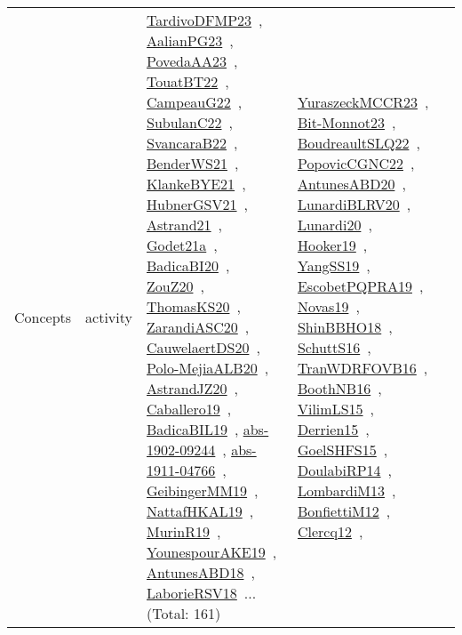 {\begin{longtable}{lp{3cm}>{\raggedright\arraybackslash}p{6cm}>{\raggedright\arraybackslash}p{6cm}>{\raggedright\arraybackslash}p{8cm}}
Concepts & activity & \href{works/TardivoDFMP23.pdf}{TardivoDFMP23}~\cite{TardivoDFMP23}, \href{works/AalianPG23.pdf}{AalianPG23}~\cite{AalianPG23}, \href{works/PovedaAA23.pdf}{PovedaAA23}~\cite{PovedaAA23}, \href{works/TouatBT22.pdf}{TouatBT22}~\cite{TouatBT22}, \href{works/CampeauG22.pdf}{CampeauG22}~\cite{CampeauG22}, \href{works/SubulanC22.pdf}{SubulanC22}~\cite{SubulanC22}, \href{works/SvancaraB22.pdf}{SvancaraB22}~\cite{SvancaraB22}, \href{works/BenderWS21.pdf}{BenderWS21}~\cite{BenderWS21}, \href{works/KlankeBYE21.pdf}{KlankeBYE21}~\cite{KlankeBYE21}, \href{works/HubnerGSV21.pdf}{HubnerGSV21}~\cite{HubnerGSV21}, \href{works/Astrand21.pdf}{Astrand21}~\cite{Astrand21}, \href{works/Godet21a.pdf}{Godet21a}~\cite{Godet21a}, \href{works/BadicaBI20.pdf}{BadicaBI20}~\cite{BadicaBI20}, \href{works/ZouZ20.pdf}{ZouZ20}~\cite{ZouZ20}, \href{works/ThomasKS20.pdf}{ThomasKS20}~\cite{ThomasKS20}, \href{works/ZarandiASC20.pdf}{ZarandiASC20}~\cite{ZarandiASC20}, \href{works/CauwelaertDS20.pdf}{CauwelaertDS20}~\cite{CauwelaertDS20}, \href{works/Polo-MejiaALB20.pdf}{Polo-MejiaALB20}~\cite{Polo-MejiaALB20}, \href{works/AstrandJZ20.pdf}{AstrandJZ20}~\cite{AstrandJZ20}, \href{works/Caballero19.pdf}{Caballero19}~\cite{Caballero19}, \href{works/BadicaBIL19.pdf}{BadicaBIL19}~\cite{BadicaBIL19}, \href{works/abs-1902-09244.pdf}{abs-1902-09244}~\cite{abs-1902-09244}, \href{works/abs-1911-04766.pdf}{abs-1911-04766}~\cite{abs-1911-04766}, \href{works/GeibingerMM19.pdf}{GeibingerMM19}~\cite{GeibingerMM19}, \href{works/NattafHKAL19.pdf}{NattafHKAL19}~\cite{NattafHKAL19}, \href{works/MurinR19.pdf}{MurinR19}~\cite{MurinR19}, \href{works/YounespourAKE19.pdf}{YounespourAKE19}~\cite{YounespourAKE19}, \href{works/AntunesABD18.pdf}{AntunesABD18}~\cite{AntunesABD18}, \href{works/LaborieRSV18.pdf}{LaborieRSV18}~\cite{LaborieRSV18}... (Total: 161) & \href{works/YuraszeckMCCR23.pdf}{YuraszeckMCCR23}~\cite{YuraszeckMCCR23}, \href{works/Bit-Monnot23.pdf}{Bit-Monnot23}~\cite{Bit-Monnot23}, \href{works/BoudreaultSLQ22.pdf}{BoudreaultSLQ22}~\cite{BoudreaultSLQ22}, \href{works/PopovicCGNC22.pdf}{PopovicCGNC22}~\cite{PopovicCGNC22}, \href{works/AntunesABD20.pdf}{AntunesABD20}~\cite{AntunesABD20}, \href{works/LunardiBLRV20.pdf}{LunardiBLRV20}~\cite{LunardiBLRV20}, \href{works/Lunardi20.pdf}{Lunardi20}~\cite{Lunardi20}, \href{works/Hooker19.pdf}{Hooker19}~\cite{Hooker19}, \href{works/YangSS19.pdf}{YangSS19}~\cite{YangSS19}, \href{works/EscobetPQPRA19.pdf}{EscobetPQPRA19}~\cite{EscobetPQPRA19}, \href{works/Novas19.pdf}{Novas19}~\cite{Novas19}, \href{works/ShinBBHO18.pdf}{ShinBBHO18}~\cite{ShinBBHO18}, \href{works/SchuttS16.pdf}{SchuttS16}~\cite{SchuttS16}, \href{works/TranWDRFOVB16.pdf}{TranWDRFOVB16}~\cite{TranWDRFOVB16}, \href{works/BoothNB16.pdf}{BoothNB16}~\cite{BoothNB16}, \href{works/VilimLS15.pdf}{VilimLS15}~\cite{VilimLS15}, \href{works/Derrien15.pdf}{Derrien15}~\cite{Derrien15}, \href{works/GoelSHFS15.pdf}{GoelSHFS15}~\cite{GoelSHFS15}, \href{works/DoulabiRP14.pdf}{DoulabiRP14}~\cite{DoulabiRP14}, \href{works/LombardiM13.pdf}{LombardiM13}~\cite{LombardiM13}, \href{works/BonfiettiM12.pdf}{BonfiettiM12}~\cite{BonfiettiM12}, \href{works/Clercq12.pdf}{Clercq12}~\cite{Clercq12}, 
\end{longtable}}
